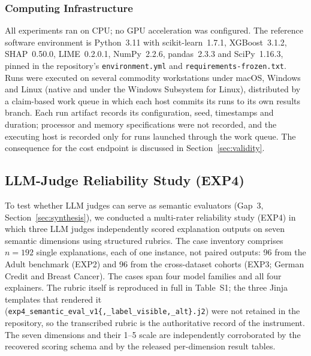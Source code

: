 \documentclass[fleqn,10pt,lineno]{wlpeerj}
\begin{document}
\subsubsection{Computing Infrastructure}
\label{sec:infrastructure}

All experiments ran on CPU; no GPU acceleration was configured. The
reference software environment is Python~3.11 with scikit-learn~1.7.1,
XGBoost~3.1.2, SHAP~0.50.0, LIME~0.2.0.1, NumPy~2.2.6, pandas~2.3.3 and
SciPy~1.16.3, pinned in the repository's \texttt{environment.yml} and
\texttt{requirements-frozen.txt}. Runs were executed on several commodity
workstations under macOS, Windows and Linux (native and under the Windows
Subsystem for Linux), distributed by a claim-based work queue in which each
host commits its runs to its own results branch. Each run artifact records
its configuration, seed, timestamps and duration; processor and memory
specifications were not recorded, and the executing host is recorded only for
runs launched through the work queue. The consequence for the cost endpoint
is discussed in Section~\ref{sec:validity}.

\subsection{LLM-Judge Reliability Study (EXP4)}
\label{sec:exp4_methods}

To test whether LLM judges can serve as semantic evaluators (Gap~3,
Section~\ref{sec:synthesis}), we conducted a multi-rater reliability
study (EXP4) in which three LLM judges independently scored explanation
outputs on seven semantic dimensions using structured rubrics. The case
inventory comprises $n=192$ single explanations, each of one instance, not
paired outputs: 96 from the Adult benchmark (EXP2) and 96 from the
cross-dataset cohorts (EXP3; German Credit and Breast Cancer). The cases span
four model families and all four explainers.
The rubric itself is reproduced in full in Table~S1; the three
Jinja templates that rendered it
(\texttt{exp4\_semantic\_eval\_v1\{,\_label\_visible,\_alt\}.j2}) were not
retained in the repository, so the transcribed rubric is the authoritative
record of the instrument. The seven dimensions and their 1--5 scale are
independently corroborated by the recovered scoring schema and by the released
per-dimension result tables.
\end{document}
